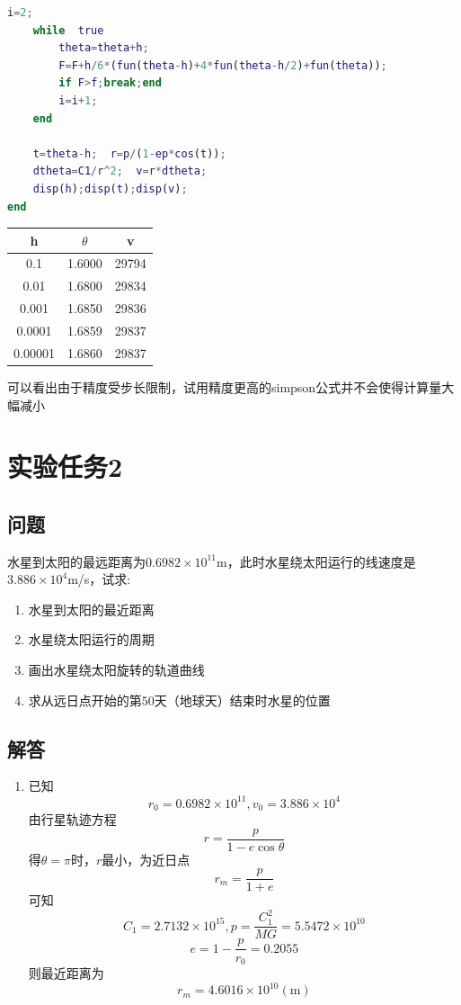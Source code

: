 \documentclass[12pt]{article}
\begin{document}
\begin{CJK*}{UTF8}{gbsn}
\begin{lstlisting}[language = matlab]
    i=2;
    while  true
        theta=theta+h;
        F=F+h/6*(fun(theta-h)+4*fun(theta-h/2)+fun(theta));
        if F>f;break;end
        i=i+1;
    end

    t=theta-h;  r=p/(1-ep*cos(t));
    dtheta=C1/r^2;  v=r*dtheta;
    disp(h);disp(t);disp(v);
end

\end{lstlisting}

\begin{tabular}{|c|c|c|}
\hline
h&$\theta$&v\\
\hline
0.1&1.6000&29794\\
\hline
0.01&1.6800&29834\\
\hline
0.001&1.6850&29836\\
\hline
0.0001&1.6859&29837\\
\hline
0.00001&1.6860&29837\\
\hline
\end{tabular}

可以看出由于精度受步长限制，试用精度更高的simpson公式并不会使得计算量大幅减小\\

\section{实验任务2}
\subsection*{问题}
水星到太阳的最远距离为$0.6982\times10^{11}$m，此时水星绕太阳运行的线速度是$3.886\times10^4$m/s，试求:
\begin{enumerate}
\item
水星到太阳的最近距离

\item
水星绕太阳运行的周期

\item
画出水星绕太阳旋转的轨道曲线

\item
求从远日点开始的第$50$天（地球天）结束时水星的位置

\end{enumerate}

\subsection*{解答}
\begin{enumerate}
\item
已知$$r_0=0.6982\times10^{11}, v_0=3.886\times10^4$$
由行星轨迹方程$$r=\frac{p}{1-e\cos\theta}$$
得$\theta=\pi$时，$r$最小，为近日点\\
$$r_m=\frac{p}{1+e}$$
可知$$C_1=2.7132\times10^{15}, p=\frac{C_1^2}{MG}=5.5472\times10^{10}$$
$$e=1-\dfrac{p}{r_0}=0.2055$$
则最近距离为$$r_m=4.6016\times10^{10}(\mathrm{m})$$


\end{enumerate}
\end{CJK*}
\end{document}
